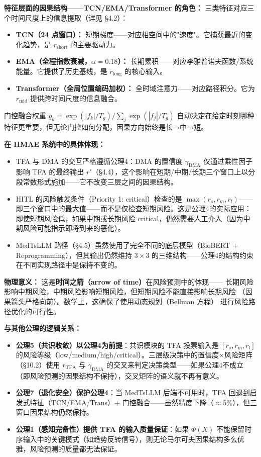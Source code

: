 \documentclass[11pt,a4paper]{ctexart}
\theoremstyle{remark}
\begin{document}
\textbf{特征层面的因果结构——TCN/EMA/Transformer 的角色：} 三类特征对应三个时间尺度上的信息提取（详见 §4.2）：
\begin{itemize}[nosep]
\item \textbf{TCN（24 点窗口）：} 短期梯度——对应相空间中的"速度"。它捕获最近的变化趋势，是 $r_{\text{short}}$ 的主要驱动力。
\item \textbf{EMA（全程指数衰减，$\alpha=0.18$）：} 长期累积——对应李雅普诺夫函数/系统能量。它提供了历史基线，是 $r_{\text{long}}$ 的核心输入。
\item \textbf{Transformer（全局位置编码加权）：} 全时域注意力——对应路径积分。它为 $r_{\text{mid}}$ 提供跨时间尺度的信息融合。
\end{itemize}
门控融合权重 $g_k = \exp(|f_k|/T_g) / \sum_j \exp(|f_j|/T_g)$ 自动决定在给定时刻哪种特征更重要，但无论门控如何分配，因果方向始终是长→中→短。

\textbf{在 HMAE 系统中的具体体现：}
\begin{itemize}[nosep]
\item TFA 与 DMA 的交互严格遵循公理4：DMA 的置信度 $\gamma_{\text{DMA}}$ 仅通过乘性因子影响 TFA 的最终输出 $r'$（§4.4），这个影响在短期/中期/长期三个窗口上以分段常数形式施加——它不改变三层之间的因果结构。
\item HITL 的风险触发条件（Priority 1: critical）检查的是 $\max(r_s, r_m, r_l)$——即三个窗口中的最大值——而不是仅检查短期风险。这是公理4的实际应用：即使短期风险低，如果中期或长期风险 critical，仍然需要人工介入（因为中期风险可能指示即将到来的恶化）。
\item MedTsLLM 路径（§4.5）虽然使用了完全不同的底层模型（BioBERT + Reprogramming），但其输出仍然维持 $3 \times 3$ 的三维结构——公理4的结构约束在不同实现路径中是保持不变的。
\end{itemize}

\textbf{物理意义：} 这是\textbf{时间之箭（arrow of time）}在风险预测中的体现——
长期风险影响中期风险，中期风险影响短期风险，但短期风险不能直接影响长期风险
（因果箭头严格向前）。数学上，这确保了使用动态规划（Bellman 方程）
进行风险路径优化的可行性。

\textbf{与其他公理的逻辑关系：}
\begin{itemize}[nosep]
\item \textbf{公理5（共识收敛）以公理4为前提}：共识模块的 TFA 投票输入是 $[r_s, r_m, r_l]$ 的风险等级（low/medium/high/critical）。三层级决策中的置信度×风险矩阵（§10.2）使用 $r_{\text{TFA}}$ 与 $\gamma_{\text{DMA}}$ 的交叉来判定决策类型——如果公理4不成立（即风险预测的因果结构不保持），交叉矩阵的语义就不再有意义。
\item \textbf{公理7（退化安全）保护公理4}：当 MedTsLLM 后端不可用时，TFA 回退到启发式特征（TCN/EMA/Trans）+ 门控融合——虽然精度下降（$\approx 5\%$），但三窗口因果结构仍然保持。
\item \textbf{公理1（感知完备性）提供 TFA 的输入质量保证}：如果 $\Phi(X)$ 不能保留时序输入中的关键模式（如趋势反转信号），则无论马尔可夫因果结构多么优雅，风险预测的质量都无法保证。
\end{itemize}
\end{document}
